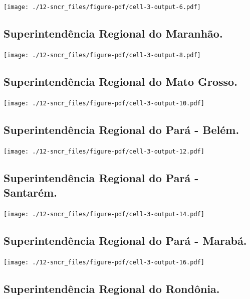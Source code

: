 \documentclass[
  letterpaper,
]{report}
\begin{document}
\texttt{[image: ./12-sncr\_files/figure-pdf/cell-3-output-6.pdf]}

\hypertarget{superintenduxeancia-regional-do-maranhuxe3o.-2}{%
\subsection{Superintendência Regional do
Maranhão.}\label{superintenduxeancia-regional-do-maranhuxe3o.-2}}

\texttt{[image: ./12-sncr\_files/figure-pdf/cell-3-output-8.pdf]}

\hypertarget{superintenduxeancia-regional-do-mato-grosso.-2}{%
\subsection{Superintendência Regional do Mato
Grosso.}\label{superintenduxeancia-regional-do-mato-grosso.-2}}

\texttt{[image: ./12-sncr\_files/figure-pdf/cell-3-output-10.pdf]}

\hypertarget{superintenduxeancia-regional-do-paruxe1---beluxe9m.-2}{%
\subsection{Superintendência Regional do Pará -
Belém.}\label{superintenduxeancia-regional-do-paruxe1---beluxe9m.-2}}

\texttt{[image: ./12-sncr\_files/figure-pdf/cell-3-output-12.pdf]}

\hypertarget{superintenduxeancia-regional-do-paruxe1---santaruxe9m.-2}{%
\subsection{Superintendência Regional do Pará -
Santarém.}\label{superintenduxeancia-regional-do-paruxe1---santaruxe9m.-2}}

\texttt{[image: ./12-sncr\_files/figure-pdf/cell-3-output-14.pdf]}

\hypertarget{superintenduxeancia-regional-do-paruxe1---marabuxe1.-2}{%
\subsection{Superintendência Regional do Pará -
Marabá.}\label{superintenduxeancia-regional-do-paruxe1---marabuxe1.-2}}

\texttt{[image: ./12-sncr\_files/figure-pdf/cell-3-output-16.pdf]}

\hypertarget{superintenduxeancia-regional-do-ronduxf4nia.-2}{%
\subsection{Superintendência Regional do
Rondônia.}\label{superintenduxeancia-regional-do-ronduxf4nia.-2}}
\end{document}
